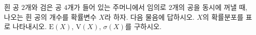 흰 공 $2$개와 검은 공 $4$개가 들어 있는 주머니에서 임의로 $2$개의 공을 동시에 꺼낼 때, 나오는 흰 공의 개수를 확률변수 $X$라 하자. 다음 물음에 답하시오.
 $X$의 확률분포를 표로 나타내시오.
 $\mathrm{E}(X)$, $\mathrm{V}(X)$, $\sigma(X)$를 구하시오.
